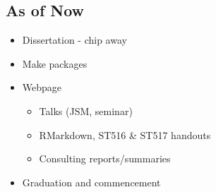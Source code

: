 \documentclass{article}
\begin{document}
\subsection*{As of Now}
\begin{itemize}
\item Dissertation - chip away
\item Make packages
\item Webpage
  \begin{itemize}
  \item Talks (JSM, seminar)
  \item RMarkdown, ST516 \& ST517 handouts
  \item Consulting reports/summaries
  \end{itemize}
\item Graduation and commencement
\end{itemize}

% 

\end{document}
